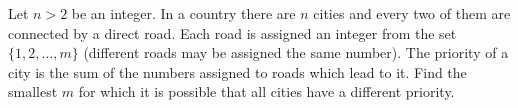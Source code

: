 Let $n>2$ be an integer. In a country there are $n$ cities and every two of them are connected by a direct road. Each road is assigned an integer from the set $\{1, 2,\ldots ,m\}$ (different roads may be assigned the same number). The priority of a city is the sum of the numbers assigned to roads which lead to it. Find the smallest $m$ for which it is possible that all cities have a different priority.